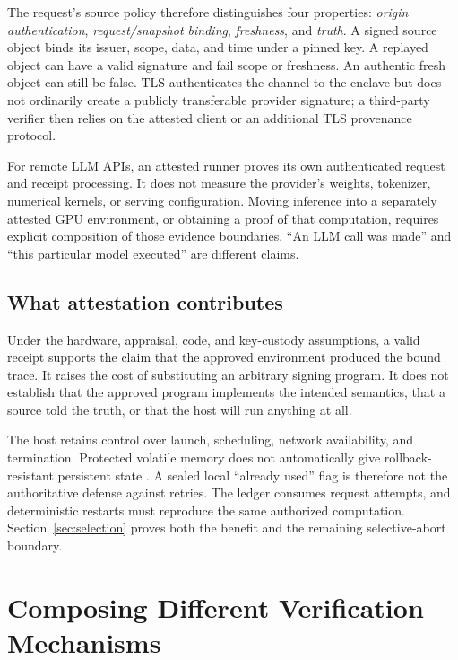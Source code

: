 The request's source policy therefore distinguishes four properties: \emph{origin authentication}, \emph{request/snapshot binding}, \emph{freshness}, and \emph{truth}. A signed source object binds its issuer, scope, data, and time under a pinned key. A replayed object can have a valid signature and fail scope or freshness. An authentic fresh object can still be false. TLS authenticates the channel to the enclave but does not ordinarily create a publicly transferable provider signature; a third-party verifier then relies on the attested client or an additional TLS provenance protocol.

For remote LLM APIs, an attested runner proves its own authenticated request and receipt processing. It does not measure the provider's weights, tokenizer, numerical kernels, or serving configuration. Moving inference into a separately attested GPU environment, or obtaining a proof of that computation, requires explicit composition of those evidence boundaries. ``An LLM call was made'' and ``this particular model executed'' are different claims.

\subsection{What attestation contributes}

Under the hardware, appraisal, code, and key-custody assumptions, a valid receipt supports the claim that the approved environment produced the bound trace. It raises the cost of substituting an arbitrary signing program. It does not establish that the approved program implements the intended semantics, that a source told the truth, or that the host will run anything at all.

The host retains control over launch, scheduling, network availability, and termination. Protected volatile memory does not automatically give rollback-resistant persistent state \cite{teerex2026}. A sealed local ``already used'' flag is therefore not the authoritative defense against retries. The ledger consumes request attempts, and deterministic restarts must reproduce the same authorized computation. Section~\ref{sec:selection} proves both the benefit and the remaining selective-abort boundary.

\section{Composing Different Verification Mechanisms}
\label{sec:composition}

